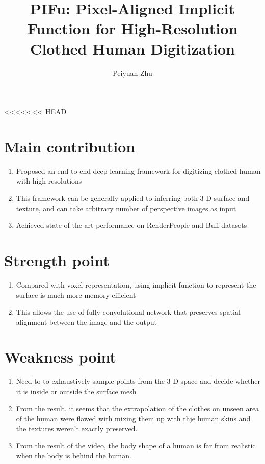 \documentclass{article}
\author{Peiyuan Zhu}
\title{PIFu: Pixel-Aligned Implicit Function for High-Resolution Clothed Human Digitization}
\begin{document}
	\maketitle
<<<<<<< HEAD
	\section{Main contribution}
	\begin{enumerate}
		\item Proposed an end-to-end deep learning framework for digitizing clothed human with high resolutions
		\item This framework can be generally applied to inferring both 3-D surface and texture, and can take arbitrary number of perspective images as input
		\item Achieved state-of-the-art performance on RenderPeople and Buff datasets
	\end{enumerate}
	\section{Strength point}
	\begin{enumerate}
		\item Compared with voxel representation, using implicit function to represent the surface is much more memory efficient 
		\item This allows the use of fully-convolutional network that preserves spatial alignment between the image and the output
	\end{enumerate}
	\section{Weakness point}
	\begin{enumerate}
		\item Need to to exhaustively sample points from the 3-D space and decide whether it is inside or outside the surface mesh
		\item From the result, it seems that the extrapolation of the clothes on unseen area of the human were flawed with mixing them up with thje human skins and the textures weren't exactly preserved. 
		\item From the result of the video, the body shape of a human is far from realistic when the body is behind the human.
	\end{enumerate}
\end{document}
